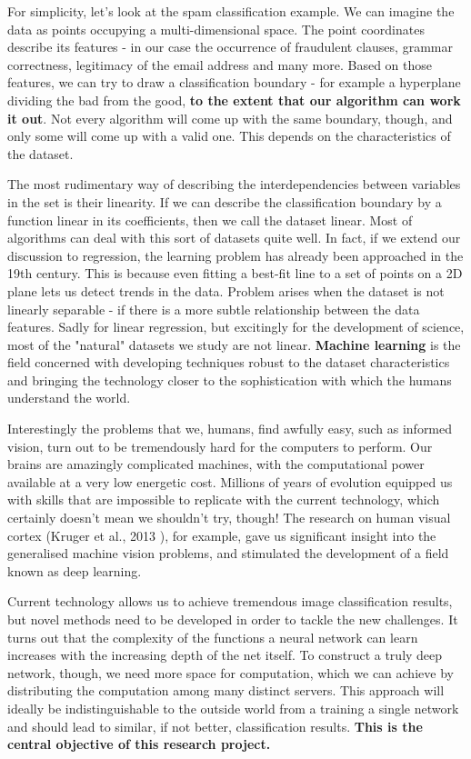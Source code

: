 \documentclass[a4paper, 12pt]{article}
\numberwithin{equation}{section}
\begin{document}
	For simplicity, let's look at the spam classification example. We can imagine the data as points occupying a multi-dimensional space. The point coordinates describe its features - in our case the occurrence of fraudulent clauses, grammar correctness, legitimacy of the email address and many more. Based on those features, we can try to draw a classification boundary - for example a hyperplane dividing the bad from the good, \textbf{to the extent that our algorithm can work it out}. Not every algorithm will come up with the same boundary, though, and only some will come up with a valid one. This depends on the characteristics of the dataset.

	The most rudimentary way of describing the interdependencies between variables in the set is their linearity. If we can describe the classification boundary by a function linear in its coefficients, then we call the dataset linear. Most of algorithms can deal with this sort of datasets quite well. In fact, if we extend our discussion to regression, the learning problem has already been approached in the 19th century. This is because even fitting a best-fit line to a set of points on a 2D plane lets us detect trends in the data. Problem arises when the dataset is not linearly separable - if there is a more subtle relationship between the data features. Sadly for linear regression, but excitingly for the development of science, most of the "natural" datasets we study are not linear. \textbf{Machine learning} is the field concerned with developing techniques robust to the dataset characteristics and bringing the technology closer to the sophistication with which the humans understand the world.

	Interestingly the problems that we, humans, find awfully easy, such as informed vision, turn out to be tremendously hard for the computers to perform. Our brains are amazingly complicated machines, with the computational power available at a very low energetic cost. Millions of years of evolution equipped us with skills that are impossible to replicate with the current technology, which certainly doesn't mean we shouldn't try, though! The research on human visual cortex (Kruger et al., 2013 \cite{kruger2013deep}), for example, gave us significant insight into the generalised machine vision problems, and stimulated the development of a field known as deep learning.

	Current technology allows us to achieve tremendous image classification results, but novel methods need to be developed in order to tackle the new challenges. It turns out that the complexity of the functions a neural network can learn increases with the increasing depth of the net itself. To construct a truly deep network, though, we need more space for computation, which we can achieve by distributing the computation among many distinct servers. This approach will ideally be indistinguishable to the outside world from a training a single network and should lead to similar, if not better, classification results. \textbf{This is the central objective of this research project.}
\end{document}
